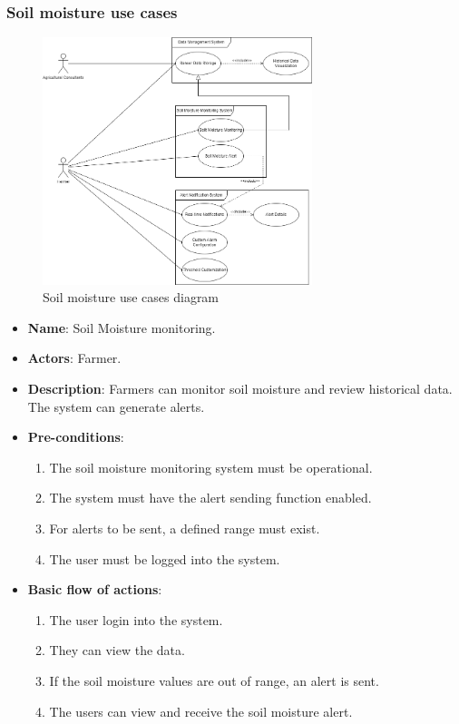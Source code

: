 \subsubsection*{Soil moisture use cases}
\begin{figure}[H]
    \centering
    \includegraphics[width=0.7\textwidth]{./images/6/data_soil_alert_uses.png}
    \caption{Soil moisture use cases diagram}
\end{figure}
\begin{itemize}
    \item \textbf{Name}: Soil Moisture monitoring.
    \item \textbf{Actors}: Farmer.
    \item \textbf{Description}: Farmers can monitor soil moisture and review historical data. The system can generate alerts.
    \item \textbf{Pre-conditions}:
        \begin{enumerate}
            \item The soil moisture monitoring system must be operational.
            \item The system must have the alert sending function enabled.
            \item For alerts to be sent, a defined range must exist.
            \item The user must be logged into the system.
        \end{enumerate}
    \item \textbf{Basic flow of actions}:
        \begin{enumerate}
            \item The user login into the system.
            \item They can view the data.
            \item If the soil moisture values are out of range, an alert is sent.
            \item The users can view and receive the soil moisture alert.
        \end{enumerate}
\end{itemize}

